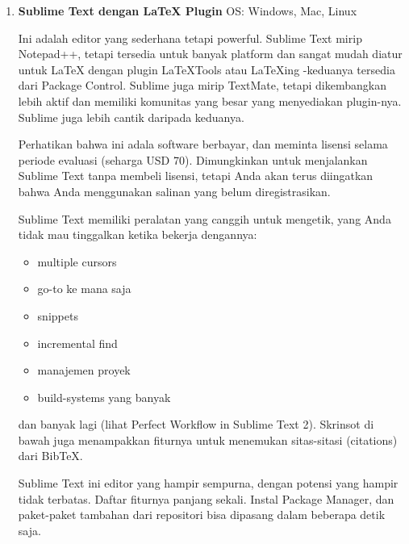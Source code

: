 \begin{enumerate}
\item \textbf{Sublime Text dengan LaTeX Plugin}
\setcounter{numberedCntE}{\theenumi}
\hspace{0,2in}OS: Windows, Mac, Linux

Ini adalah editor yang sederhana tetapi powerful. Sublime Text mirip Notepad++, tetapi tersedia untuk banyak platform dan sangat mudah diatur untuk LaTeX dengan plugin LaTeXTools atau LaTeXing -keduanya tersedia dari Package Control. Sublime juga mirip TextMate, tetapi dikembangkan lebih aktif dan memiliki komunitas yang besar yang menyediakan plugin-nya. Sublime juga lebih cantik daripada keduanya.
\par \vspace{12pt}

Perhatikan bahwa ini adala software berbayar, dan meminta lisensi selama periode evaluasi (seharga USD 70). Dimungkinkan untuk menjalankan Sublime Text tanpa membeli lisensi, tetapi Anda akan terus diingatkan bahwa Anda menggunakan salinan yang belum diregistrasikan.
\par \vspace{12pt}


Sublime Text memiliki peralatan yang canggih untuk mengetik, yang Anda tidak mau tinggalkan ketika bekerja dengannya:

\begin{itemize}
\item multiple cursors
\item go-to ke mana saja
\item snippets
\item incremental find
\item manajemen proyek
\item build-systems yang banyak
\end{itemize}
dan banyak lagi (lihat Perfect Workflow in Sublime Text 2). Skrinsot di bawah juga menampakkan fiturnya untuk menemukan sitas-sitasi (citations) dari BibTeX.
\par \vspace{12pt}

Sublime Text ini editor yang hampir sempurna, dengan potensi yang hampir tidak terbatas. Daftar fiturnya panjang sekali. Instal Package Manager, dan paket-paket tambahan dari repositori bisa dipasang dalam beberapa detik saja.


\end{enumerate}
